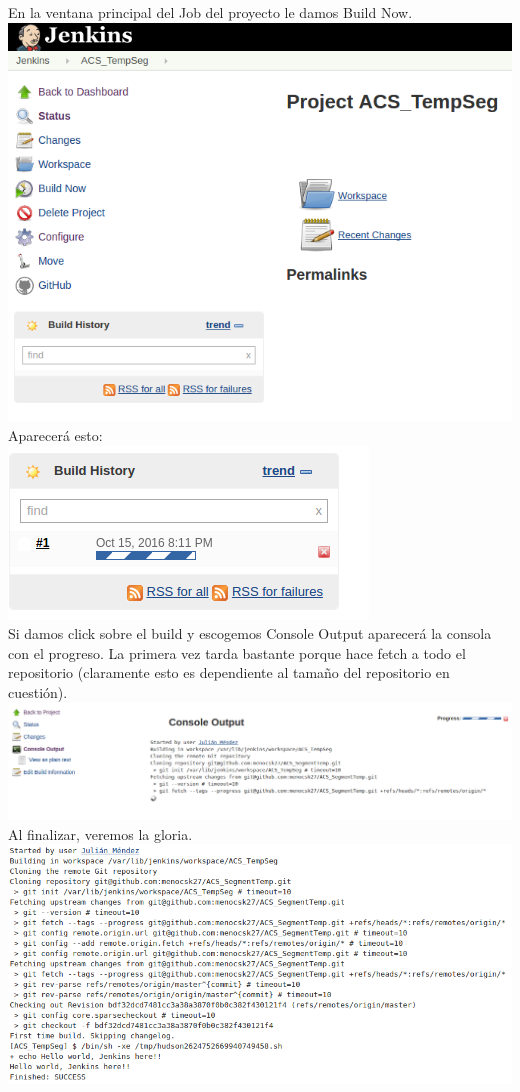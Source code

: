 \documentclass[a4paper]{article}
\begin{document}
{   En la ventana principal del Job del proyecto le damos Build Now. \\
      \includegraphics[scale=0.5]{buildnow}\\
   Aparecerá esto:\\ \includegraphics[scale=0.5]{build_in_progress}\\
   Si damos click sobre el build y escogemos Console Output aparecerá la consola con el progreso. La primera vez tarda bastante porque hace fetch a todo el repositorio (claramente esto es dependiente al tamaño del repositorio en cuestión). \\
   \includegraphics[scale=0.5]{progress}\\
   
   Al finalizar, veremos la gloria. \\
   \includegraphics[scale=0.5]{glory}\\
   
}
\end{document}
